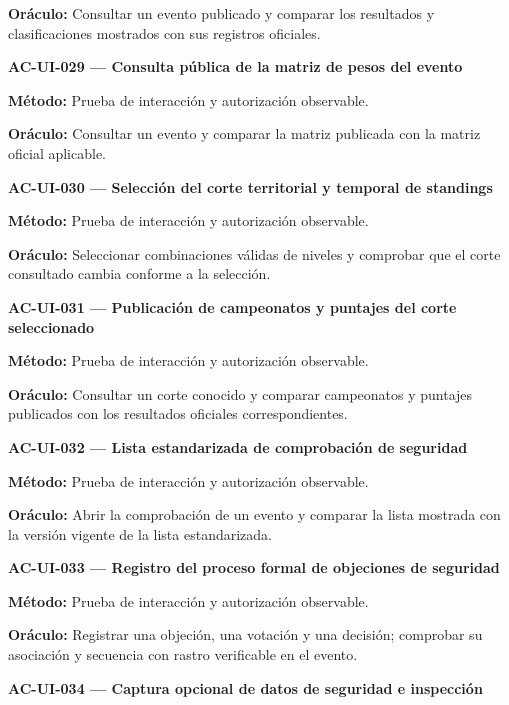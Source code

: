 \documentclass[10pt,letterpaper]{article}
\begin{document}
\textbf{Oráculo:} Consultar un evento publicado y comparar los resultados y clasificaciones mostrados con sus registros oficiales.\par\vspace{0.45em}
\noindent\textbf{AC-UI-029 --- Consulta pública de la matriz de pesos del evento}\par
\textbf{Método:} Prueba de interacción y autorización observable.\par
\textbf{Oráculo:} Consultar un evento y comparar la matriz publicada con la matriz oficial aplicable.\par\vspace{0.45em}
\noindent\textbf{AC-UI-030 --- Selección del corte territorial y temporal de standings}\par
\textbf{Método:} Prueba de interacción y autorización observable.\par
\textbf{Oráculo:} Seleccionar combinaciones válidas de niveles y comprobar que el corte consultado cambia conforme a la selección.\par\vspace{0.45em}
\noindent\textbf{AC-UI-031 --- Publicación de campeonatos y puntajes del corte seleccionado}\par
\textbf{Método:} Prueba de interacción y autorización observable.\par
\textbf{Oráculo:} Consultar un corte conocido y comparar campeonatos y puntajes publicados con los resultados oficiales correspondientes.\par\vspace{0.45em}
\noindent\textbf{AC-UI-032 --- Lista estandarizada de comprobación de seguridad}\par
\textbf{Método:} Prueba de interacción y autorización observable.\par
\textbf{Oráculo:} Abrir la comprobación de un evento y comparar la lista mostrada con la versión vigente de la lista estandarizada.\par\vspace{0.45em}
\noindent\textbf{AC-UI-033 --- Registro del proceso formal de objeciones de seguridad}\par
\textbf{Método:} Prueba de interacción y autorización observable.\par
\textbf{Oráculo:} Registrar una objeción, una votación y una decisión; comprobar su asociación y secuencia con rastro verificable en el evento.\par\vspace{0.45em}
\noindent\textbf{AC-UI-034 --- Captura opcional de datos de seguridad e inspección}\par
\end{document}
